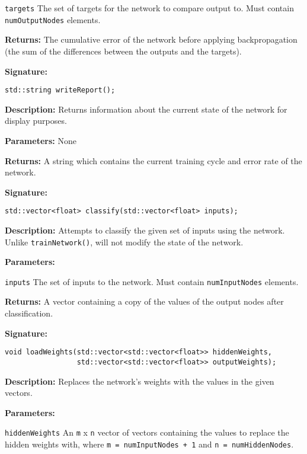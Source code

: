 \documentclass[a4paper]{article}
\begin{document}
\lstinline{targets} The set of targets for the network to compare output to. Must contain \lstinline{numOutputNodes} elements.

\textbf{Returns: }
The cumulative error of the network before applying backpropagation (the sum of the differences between the outputs and the targets).

\hrulefill %

\textbf{Signature:} \begin{lstlisting}
std::string writeReport();
\end{lstlisting}

\textbf{Description: }
Returns information about the current state of the network for display purposes.

\textbf{Parameters: } None

\textbf{Returns: }
A string which contains the current training cycle and error rate of the network.

\hrulefill %

\textbf{Signature:} \begin{lstlisting}
std::vector<float> classify(std::vector<float> inputs);
\end{lstlisting}

\textbf{Description: }
Attempts to classify the given set of inputs using the network. Unlike \lstinline{trainNetwork()}, will not modify the state of the network.

\textbf{Parameters: }

\lstinline{inputs} The set of inputs to the network. Must contain \lstinline{numInputNodes} elements.

\textbf{Returns: }
A vector containing a copy of the values of the output nodes after classification.
\hrulefill %

\textbf{Signature:} \begin{lstlisting}
void loadWeights(std::vector<std::vector<float>> hiddenWeights,
                 std::vector<std::vector<float>> outputWeights);
\end{lstlisting}

\textbf{Description: }
Replaces the network's weights with the values in the given vectors.

\textbf{Parameters: }

\lstinline{hiddenWeights} An \lstinline{m} x \lstinline{n} vector of vectors containing the values to replace the hidden weights with, where \lstinline{m = numInputNodes + 1} and \lstinline{n = numHiddenNodes}.
\end{document}
